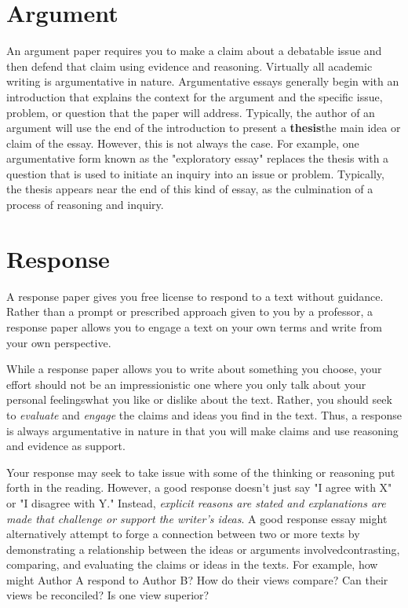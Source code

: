 \hypertarget{argument}{} \section{Argument}

An argument paper requires you to make a claim about a debatable issue and then
defend that claim using evidence and reasoning. Virtually all academic writing
is argumentative in nature. Argumentative essays generally begin with an introduction
that explains the context for the argument and the specific issue, problem, or
question that the paper will address. Typically, the author of an argument will
use the end of the introduction to present a \textbf{thesis}\textemdash the main
idea or claim of the essay. However, this is not always the case. For example,
one argumentative form known as the "exploratory essay" replaces the thesis with a
question that is used to initiate an inquiry into an issue or problem. Typically, the
thesis appears near the end of this kind of essay, as the culmination of a process
of reasoning and inquiry.


\hypertarget{responseessay}{} \section{Response}

A response paper gives you free license to respond to a text without guidance.
Rather than a prompt or prescribed approach given to you by a professor, a
response paper allows you to engage a text on your own terms and write from your
own perspective.

While a response paper allows you to write about something you choose, your
effort should not be an impressionistic one where you only talk about your
personal feelings\textemdash what you like or dislike about the text. Rather,
you should seek to \emph{evaluate} and \emph{engage} the claims and ideas you
find in the text. Thus, a response is always argumentative in nature in that you will make 
claims and use reasoning and evidence as support.

Your response may seek to take issue with some of the thinking or reasoning put
forth in the reading. However, a good response doesn't just say "I agree with X"
or "I disagree with Y." Instead, \emph{explicit reasons are stated and
explanations are made that challenge or support the writer's ideas}. A good
response essay might alternatively attempt to forge a connection between two or
more texts by demonstrating a relationship between the ideas or arguments
involved\textemdash contrasting, comparing, and evaluating the claims or ideas
in the texts. For example, how might Author A respond to Author B? How
do their views compare? Can their views be reconciled? Is one view superior?

